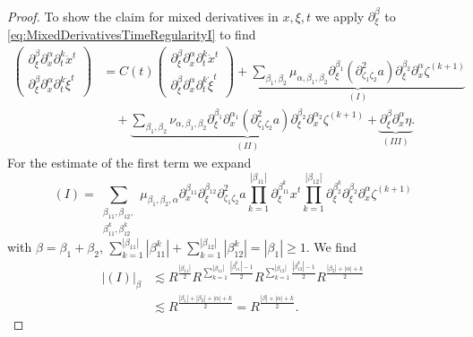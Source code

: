 \documentclass{amsart}
\theoremstyle{definition}
\begin{document}
\begin{proof}
To show the claim for mixed derivatives in $x,\xi,t$ we apply $\partial_{\xi}^{\beta}$ to \eqref{eq:MixedDerivativesTimeRegularityI} to find
\begin{equation*}
\begin{split}
\begin{pmatrix}
\partial_{\xi}^{\beta} \partial_x^{\alpha} \partial_t^k \ddot{x}^t \\ \partial_{\xi}^{\beta} \partial_x^{\alpha} \partial_t^k \ddot{\xi}^t
\end{pmatrix}
&= C(t)
\begin{pmatrix}
\partial_{\xi}^{\beta} \partial_x^{\alpha} \partial_t^k \dot{x}^t \\ \partial_{\xi}^{\beta} \partial_x^{\alpha} \partial_t^k \dot{\xi}^t
\end{pmatrix}
 + \underbrace{\sum_{\beta_1,\beta_2} \mu_{\alpha,\beta_1,\beta_2} \partial_{\xi}^{\beta_1} (\partial^2_{\zeta_1 \zeta_2} a) \partial_{\xi}^{\beta_2} \partial_x^{\alpha} \zeta^{(k+1)}}_{(I)}
\\
&\quad + \underbrace{\sum_{\beta_1,\beta_2} \nu_{\alpha,\beta_1,\beta_2} \partial_{\xi}^{\beta_1} \partial_x^{\alpha_1} (\partial^2_{\zeta_1 \zeta_2} a) \partial_{\xi}^{\beta_2} \partial_x^{\alpha_2} \zeta^{(k+1)}}_{(II)} + \underbrace{\partial_{\xi}^{\beta} \partial_x^{\alpha} \eta}_{(III)}.
\end{split}
\end{equation*}
For the estimate of the first term we expand
\begin{equation*}
(I) = \sum_{\substack{\beta_{11},\beta_{12}, \\ \beta_{11}^k, \beta_{12}^k}} \mu_{\beta_1,\beta_2,\alpha} \partial_x^{\beta_{11}} \partial_{\xi}^{\beta_{12}} \partial^2_{\zeta_1 \zeta_2} a \prod_{k=1}^{|\beta_{11}|} \partial_{\xi}^{\beta_{11}^k} x^t \prod_{k=1}^{|\beta_{12}|} \partial_{\xi}^{\beta_2^k} \partial_{\xi}^{\beta_2} \partial_x^{\alpha} \zeta^{(k+1)}
\end{equation*}
with $\beta = \beta_1 + \beta_2$, $\sum_{k=1}^{|\beta_{11}|} |\beta_{11}^k| + \sum_{k=1}^{|\beta_{12}|} |\beta_{12}^k| = |\beta_1| \geq 1$. We find
\begin{equation*}
\begin{split}
|(I)|_{\beta} &\lesssim R^{\frac{|\beta_{11}|}{2}} R^{\sum_{k=1}^{|\beta_{11}|} \frac{|\beta_{11}^k| - 1}{2}} R^{\sum_{k=1}^{|\beta_{12}|} \frac{|\beta_{12}^k|-1}{2}} R^{\frac{|\beta_2|+|\alpha|+k}{2}} \\
&\lesssim R^{\frac{|\beta_1|+|\beta_2|+|\alpha|+k}{2}} = R^{\frac{|\beta|+|\alpha|+k}{2}}.
\end{split}
\end{equation*}


\end{proof}
\end{document}
